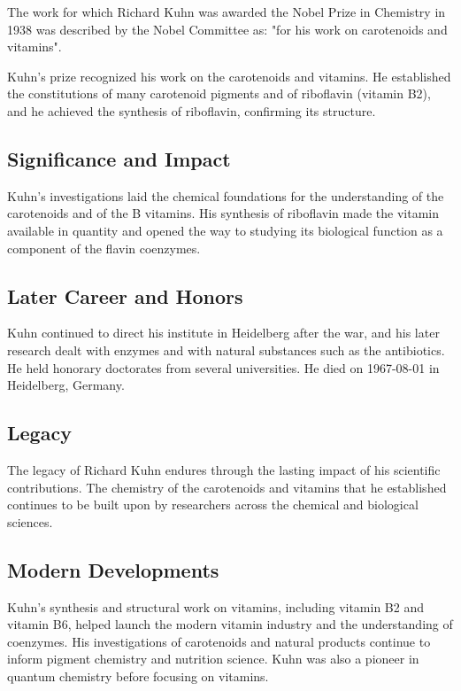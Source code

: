 The work for which Richard Kuhn was awarded the Nobel Prize in Chemistry in 1938 was described by the Nobel Committee as: "for his work on carotenoids and vitamins".

Kuhn's prize recognized his work on the carotenoids and vitamins.
He established the constitutions of many carotenoid pigments and of riboflavin (vitamin B2), and he achieved the synthesis of riboflavin, confirming its structure.

\subsection*{Significance and Impact}

Kuhn's investigations laid the chemical foundations for the understanding of the carotenoids and of the B vitamins.
His synthesis of riboflavin made the vitamin available in quantity and opened the way to studying its biological function as a component of the flavin coenzymes.

\subsection*{Later Career and Honors}

Kuhn continued to direct his institute in Heidelberg after the war, and his later research dealt with enzymes and with natural substances such as the antibiotics.
He held honorary doctorates from several universities.
He died on 1967-08-01 in Heidelberg, Germany.

\subsection*{Legacy}

The legacy of Richard Kuhn endures through the lasting impact of his scientific contributions.
The chemistry of the carotenoids and vitamins that he established continues to be built upon by researchers across the chemical and biological sciences.

\subsection*{Modern Developments}

Kuhn's synthesis and structural work on vitamins, including vitamin B2 and vitamin B6, helped launch the modern vitamin industry and the understanding of coenzymes. His investigations of carotenoids and natural products continue to inform pigment chemistry and nutrition science. Kuhn was also a pioneer in quantum chemistry before focusing on vitamins.

